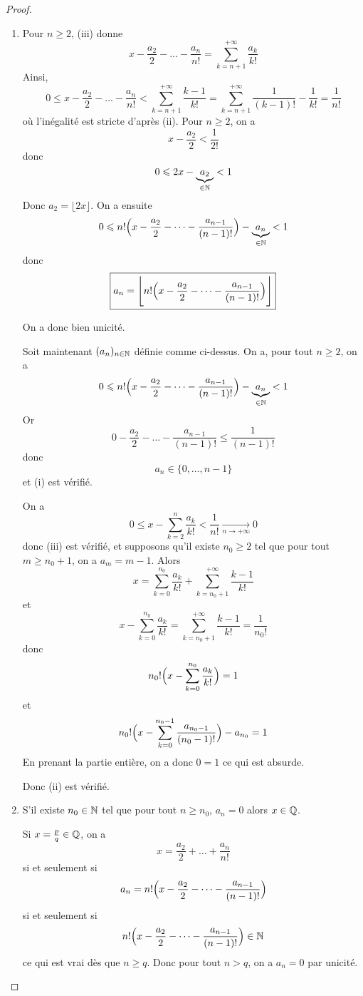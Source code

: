 \begin{proof}
	\phantom{}
	\begin{enumerate}
		\item Pour $n\geqslant2$, (iii) donne 
		$$x-\frac{a_{2}}{2}-\dots-\frac{a_{n}}{n!}=\sum_{k=n+1}^{+\infty}\frac{a_{k}}{k!}$$
		Ainsi,
		$$0\leqslant x-\frac{a_{2}}{2}-\dots-\frac{a_{n}}{n!}<\sum_{k=n+1}^{+\infty}\frac{k-1}{k!}=\sum_{k=n+1}^{+\infty}\frac{1}{(k-1)!}-\frac{1}{k!}=\frac{1}{n!}$$
		où l'inégalité est stricte d'après (ii). Pour $n\geqslant2$, on a 
		$$x-\frac{a_{2}}{2}<\frac{1}{2!}$$
		donc 
		$$0\leqslant 2x-\underbrace{a_{2}}_{\in\mathbb{N}}<1$$
		Donc $a_{2}=\lfloor 2x\rfloor$.
		On a ensuite 
		$$0\leqslant n!\Bigl(x-\frac{a_{2}}{2}-\dots-\frac{a_{n-1}}{(n-1)!}\Bigr)-\underbrace{a_{n}}_{\in\mathbb{N}}<1$$
		donc 
		$$\boxed{a_{n}=\Biggl\lfloor n!\Bigl(x-\frac{a_{2}}{2}-\dots-\frac{a_{n-1}}{(n-1)!}\Bigr)\Biggr\rfloor}$$

		On a donc bien unicité.

		Soit maintenant $(a_{n})_{n\in\mathbb{N}}$ définie comme ci-dessus. On a, pour tout $n\geqslant2$, on a 
		$$0\leqslant n!\Bigl(x-\frac{a_{2}}{2}-\dots-\frac{a_{n-1}}{(n-1)!}\Bigr)-\underbrace{a_{n}}_{\in\mathbb{N}}<1$$
		Or 
		$$0-\frac{a_{2}}{2}-\dots-\frac{a_{n-1}}{(n-1)!}\leqslant\frac{1}{(n-1)!}$$
		donc 
		$$a_{n}\in\{0,\dots,n-1\}$$
		et (i) est vérifié.

		On a 
		$$0\leqslant x-\sum_{k=2}^{n}\frac{a_{k}}{k!}<\frac{1}{n!}\xrightarrow[n\to+\infty]{}0$$
		donc (iii) est vérifié, et supposons qu'il existe $n_{0}\geqslant2$ tel que pour tout $m\geqslant n_{0}+1$, on a $a_{m}=m-1$.
		Alors 
		$$x=\sum_{k=0}^{n_{0}}\frac{a_{k}}{k!}+\sum_{k=n_{0}+1}^{+\infty}\frac{k-1}{k!}$$
		et
		$$x-\sum_{k=0}^{n_{0}}\frac{a_{k}}{k!} = \sum_{k=n_{0}+1}^{+\infty}\frac{k-1}{k!}=\frac{1}{n_{0}!}$$
		donc 
		$$n_{0}!\Bigl(x-\sum_{k=0}^{n_{0}}\frac{a_{k}}{k!}\Bigr)=1$$
		et 
		$$n_{0}!\Bigl(x-\sum_{k=0}^{n_{0}-1}\frac{a_{n_{0}-1}}{(n_{0}-1)!}\Bigr)-a_{n_{0}}=1$$
		En prenant la partie entière, on a donc $0=1$ ce qui est absurde.

		Donc (ii) est vérifié.
	
		\item S'il existe $n_{0}\in\mathbb{N}$ tel que pour tout $n\geqslant n_{0}$, $a_{n}=0$ alors $x\in\mathbb{Q}$.
		
		Si $x=\frac{p}{q}\in\mathbb{Q}$, on a 
		$$x=\frac{a_{2}}{2}+\dots+\frac{a_{n}}{n!}$$
		si et seulement si 
		$$a_{n}=n!\Bigl(x-\frac{a_{2}}{2}-\dots-\frac{a_{n-1}}{(n-1)!}\Bigr)$$
		si et seulement si 
		$$n!\Bigl(x-\frac{a_{2}}{2}-\dots-\frac{a_{n-1}}{(n-1)!}\Bigr)\in\mathbb{N}$$
		ce qui est vrai dès que $n\geqslant q$. Donc pour tout $n > q$, on a $a_{n}=0$ par unicité.


\end{enumerate}
\end{proof}
